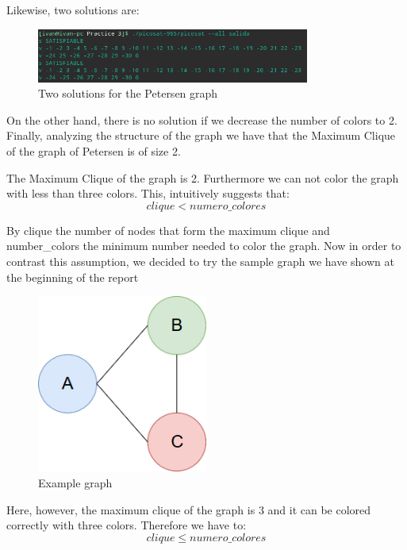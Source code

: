 \documentclass{article}
\begin{document}
    Likewise, two solutions are: 
    \begin{figure}[H]
            \centering
            \includegraphics[width=0.8\textwidth]{pictures/solution_all.png}
            \caption{Two solutions for the Petersen graph}
    \end{figure}
        
    On the other hand, there is no solution if we decrease the number of colors to 2. Finally, 
    analyzing the structure of the graph we have that the Maximum Clique of the graph of Petersen is of size 2.
 
 

    The Maximum Clique of the graph is 2.  Furthermore we can not color the graph with less than three colors. This, intuitively suggests that:
    \[clique < numero\_colores\]

    By clique the number of nodes that form the maximum clique and number\_colors the minimum number needed to color the graph. 
    Now in order to contrast this assumption, we decided to try the sample graph we have shown at the beginning of the report
    \begin{figure}[H]
        \centering
        \includegraphics[width=0.5\textwidth]{pictures/ejemplo.png}
        \caption{Example graph}
    \end{figure}

    Here, however, the maximum clique of the graph is 3 and it can be colored correctly with three colors. Therefore we have to:
    \[clique \leq numero\_colores\]
    
\end{document}
